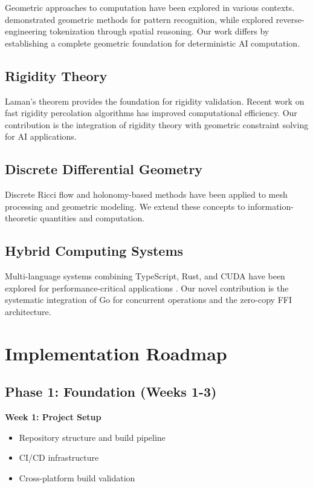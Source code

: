 \documentclass{article}
\begin{document}
Geometric approaches to computation have been explored in various contexts. \citet{nylon} demonstrated geometric methods for pattern recognition, while \citet{reverse} explored reverse-engineering tokenization through spatial reasoning. Our work differs by establishing a complete geometric foundation for deterministic AI computation.

\subsection{Rigidity Theory}

Laman's theorem \citep{laman1970} provides the foundation for rigidity validation. Recent work on fast rigidity percolation algorithms \citep{arxiv2507} has improved computational efficiency. Our contribution is the integration of rigidity theory with geometric constraint solving for AI applications.

\subsection{Discrete Differential Geometry}

Discrete Ricci flow \citep{ollivier2009} and holonomy-based methods \citep{berry1984} have been applied to mesh processing and geometric modeling. We extend these concepts to information-theoretic quantities and computation.

\subsection{Hybrid Computing Systems}

Multi-language systems combining TypeScript, Rust, and CUDA have been explored for performance-critical applications \citep{rustcuda}. Our novel contribution is the systematic integration of Go for concurrent operations and the zero-copy FFI architecture.

\section{Implementation Roadmap}

\subsection{Phase 1: Foundation (Weeks 1-3)}

\textbf{Week 1: Project Setup}
\begin{itemize}
    \item Repository structure and build pipeline
    \item CI/CD infrastructure
    \item Cross-platform build validation
\end{itemize}
\end{document}
